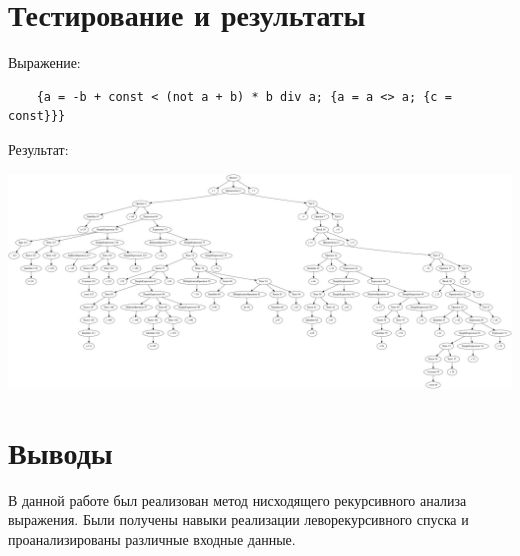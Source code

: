\documentclass{bmstu-gost-7-32}
\begin{document}
\section*{Тестирование и результаты}

Выражение:
\begin{verbatim}
	{a = -b + const < (not a + b) * b div a; {a = a <> a; {c = const}}}
\end{verbatim}

Результат:

\noindent \includegraphics[width=\linewidth]{inc/img/tree}

\section*{Выводы}

В данной работе был реализован метод нисходящего рекурсивного анализа выражения.
Были получены навыки реализации леворекурсивного спуска и проанализированы различные входные данные.
\end{document}
